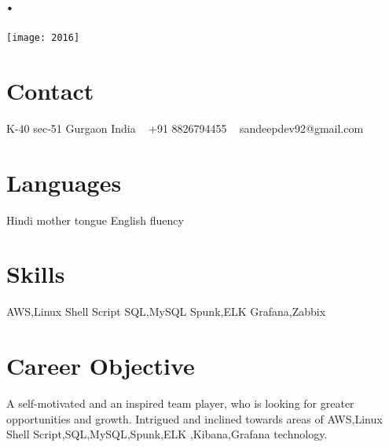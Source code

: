 \documentclass[]{cv-style}
\begin{document}
\begin{aside}
\section{.}
\texttt{[image: 2016]}
\section{Contact}
K-40 sec-51 
Gurgaon
India
~
+91 8826794455
~
sandeepdev92@gmail.com
\section{Languages}
Hindi mother tongue
English fluency
\section{Skills}
AWS,Linux Shell Script
SQL,MySQL
Spunk,ELK
Grafana,Zabbix
\end{aside}
\section{Career Objective}
  \vspace{-0.3cm}
A self-motivated and an inspired team player, who is looking for greater opportunities and growth. Intrigued and inclined towards areas of AWS,Linux Shell Script,SQL,MySQL,Spunk,ELK ,Kibana,Grafana technology. 
\end{document}
